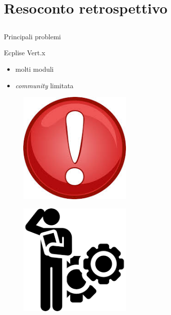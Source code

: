 \section{Resoconto retrospettivo}
	\subsection{}
		\begin{frame}{Principali problemi}
			\begin{minipage}{0.6\textwidth}
				\begin{block}{Ecplise Vert.x}
					\begin{itemize}
						\item molti moduli
						\item \emph{community} limitata
					\end{itemize}
				\end{block}
			\end{minipage}
			\begin{minipage}{0.3\textwidth}
				\begin{figure}
					\includegraphics[width=0.5\textwidth]{capitolo_4/immagini/problema.jpg}
				\end{figure}
			\end{minipage}
			\begin{minipage}{0.3\textwidth}
				\begin{figure}
					\includegraphics[width=0.5\textwidth]{capitolo_4/immagini/problema2.png}

\end{figure}
\end{minipage}
\end{frame}
